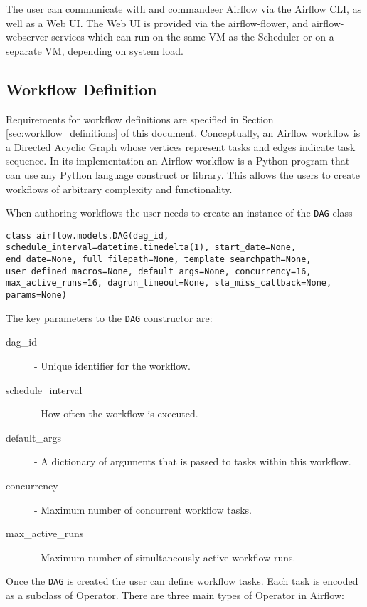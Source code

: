 The user can communicate with and commandeer Airflow via the Airflow CLI, as well as a Web UI. The Web UI is provided via the airflow-flower, and airflow-webserver services which can run on the same VM as the Scheduler or on a separate VM, depending on system load.
 
\subsection{Workflow Definition}

Requirements for workflow definitions are specified in Section \ref{sec:workflow_definitions} of this document. Conceptually, an Airflow workflow is a Directed Acyclic Graph whose vertices represent tasks and edges indicate task sequence. In its implementation an Airflow workflow is a Python program that can use any Python language construct or library. This allows the users to create workflows of arbitrary complexity and functionality.

When authoring workflows the user needs to create an instance of the \texttt{DAG} class

\begin{verbatim}
class airflow.models.DAG(dag_id, schedule_interval=datetime.timedelta(1), start_date=None, end_date=None, full_filepath=None, template_searchpath=None, user_defined_macros=None, default_args=None, concurrency=16, max_active_runs=16, dagrun_timeout=None, sla_miss_callback=None, params=None)
\end{verbatim}

The key parameters to the \texttt{DAG} constructor are:

\begin{description}
\item [dag\_id] - Unique identifier for the workflow.
\item [schedule\_interval] - How often the workflow is executed.
\item [default\_args] - A dictionary of arguments that is passed to tasks within this workflow.
\item [concurrency] - Maximum number of concurrent workflow tasks.
\item [max\_active\_runs] - Maximum number of simultaneously active workflow runs.
\end{description}

Once the \texttt{DAG} is created the user can define workflow tasks. Each task is encoded as a subclass of Operator. There are three main types of Operator in Airflow:

